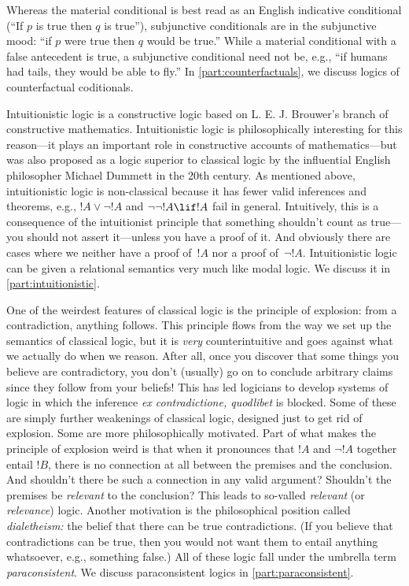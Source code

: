 Whereas the material conditional is best read as an English indicative
conditional (``If $p$ is true then $q$ is true''), subjunctive
conditionals are in the subjunctive mood: ``if $p$ were true then $q$
would be true.'' While a material conditional with a false antecedent
is true, a subjunctive conditional need not be, e.g., ``if humans had
tails, they would be able to fly.'' In \cref{part:counterfactuals}, we
discuss logics of counterfactual coditionals.

Intuitionistic logic is a constructive logic based on L. E. J.
Brouwer's branch of constructive mathematics. Intuitionistic logic is
philosophically interesting for this reason---it plays an important
role in constructive accounts of mathematics---but was also proposed
as a logic superior to classical logic by the influential English
philosopher Michael Dummett in the 20th century. As mentioned above,
intuitionistic logic is non-classical because it has fewer valid
inferences and theorems, e.g., $!A \lor \lnot !A$ and $\lnot\lnot !A
\lif !A$ fail in general. Intuitively, this is a consequence of the
intuitionist principle that something shouldn't count as true---you
should not assert it---unless you have a proof of it. And
obviously there are cases where we neither have a proof of~$!A$ nor a
proof of~$\lnot !A$. Intuitionistic logic can be given a relational
semantics very much like modal logic. We discuss it in
\cref{part:intuitionistic}.

One of the weirdest features of classical logic is the principle of
explosion: from a contradiction, anything follows. This principle
flows from the way we set up the semantics of classical logic, but it
is \emph{very} counterintuitive and goes against what we actually do
when we reason. After all, once you discover that some things you
believe are contradictory, you don't (usually) go on to conclude
arbitrary claims since they follow from your beliefs!{} This has led
logicians to develop systems of logic in which the inference \emph{ex
contradictione, quodlibet} is blocked. Some of these are simply
further weakenings of classical logic, designed just to get rid of
explosion. Some are more philosophically motivated. Part of what makes
the principle of explosion weird is that when it pronounces that $!A$
and $\lnot !A$ together entail $!B$, there is no connection at all
between the premises and the conclusion.  And shouldn't there be such
a connection in any valid argument? Shouldn't the premises be
\emph{relevant} to the conclusion?  This leads to so-valled
\emph{relevant} (or \emph{relevance}) logic. Another motivation is the
philosophical position called \emph{dialetheism:} the belief that
there can be true contradictions.  (If you believe that contradictions
can be true, then you would not want them to entail anything
whatsoever, e.g., something false.) All of these logic fall under the
umbrella term \emph{paraconsistent}. We discuss paraconsistent logics
in \cref{part:paraconsistent}.

